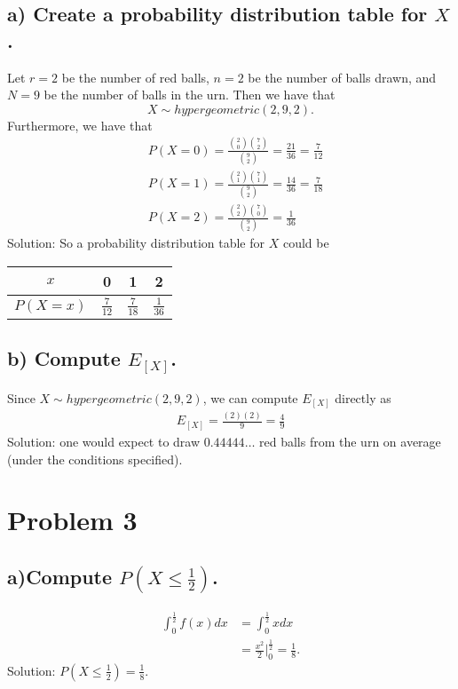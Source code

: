 \documentclass[11pt, letterpaper]{article}
\begin{document}
\subsection*{a) \normalfont Create a probability distribution table for $X$.}
Let $r=2$ be the number of red balls, $n=2$ be the number of balls drawn, and $N=9$ be the number
of balls in the urn. Then we have that 
\[X\sim hypergeometric(2, 9, 2).\]
Furthermore, we have that
\begin{align*}
    &P(X=0)=\frac{{2 \choose 0}{7 \choose 2}}{{9 \choose 2}}=\frac{21}{36}=\frac{7}{12}\\
    &P(X=1)=\frac{{2 \choose 1}{7 \choose 1}}{{9 \choose 2}}=\frac{14}{36}=\frac{7}{18}\\
    &P(X=2)=\frac{{2 \choose 2}{7 \choose 0}}{{9 \choose 2}}=\frac{1}{36}
\end{align*}
Solution: So a probability distribution table for $X$ could be
\begin{table}[h!]
    \begin{center}
        \begin{tabular}{c|c|c|c}
            $x$ & 0 & 1 & 2\\
            \hline
            $P(X=x)$ & $\frac{7}{12}$ & $\frac{7}{18}$ & $\frac{1}{36}$
        \end{tabular}
    \end{center}
\end{table}
\subsection*{b) \normalfont Compute $E_{[X]}$.}
Since $X\sim hypergeometric(2, 9, 2)$, we can compute $E_{[X]}$ directly as
\begin{align*}
    E_{[X]}=\frac{(2)(2)}{9}=\frac{4}{9}
\end{align*}
Solution: one would expect to draw $0.44444\dots$ red balls from the urn on average (under the conditions specified).

\section*{Problem 3}
\subsection*{a)\normalfont Compute $P(X\leq \frac{1}{2})$.}
\begin{align*}
    \int_0^{\frac{1}{2}}f(x)dx&=\int_0^{\frac{1}{2}}xdx\\
    &=\frac{x^2}{2}\bigg|^{\frac{1}{2}}_0=\frac{1}{8}.
\end{align*}
Solution: $P(X\leq \frac{1}{2})=\frac{1}{8}$.
\end{document}

